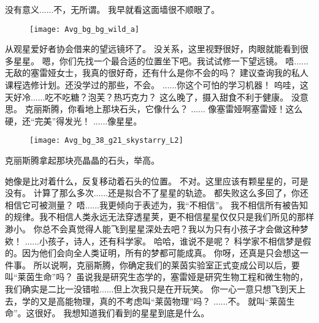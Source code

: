 \documentclass[openany]{book}
\begin{document}
\begin{dialogue}
     没有意义......不，无所谓。
     我早就看这面墙很不顺眼了。
    \begin{figure}[h]
        \centering
        \texttt{[image: Avg\_bg\_bg\_wild\_a]}
    \end{figure}
     从观星爱好者协会借来的望远镜坏了。
     没关系，这里视野很好，肉眼就能看到很多星星。
     嗯，你们先找一个最合适的位置坐下吧。我试试修一下望远镜。
     唔......无敌的塞雷娅女士，我真的很好奇，还有什么是你不会的吗？
     建议查询我的私人课程选修计划。还没学过的那些，不会。
     ......你这个可怕的学习机器！
     呜哇，这天好冷......吃不吃糖？泡芙？热巧克力？
     这么晚了，摄入甜食不利于健康。
     没意思。
     克丽斯腾，你看地上那块石头，它像什么？
     ......
     像塞雷娅啊塞雷娅！这么硬，还“完美”得发光！
     ......像星星。\par
    \begin{figure}[h]
        \centering
        \texttt{[image: Avg\_bg\_38\_g21\_skystarry\_L2]}
    \end{figure}
    克丽斯腾拿起那块亮晶晶的石头，举高。\par
    她像是比对着什么，反复移动着石头的位置。
     不对。这里应该有颗星星的，可是没有。
     计算了那么多次......还是拟合不了星星的轨迹。
     都失败这么多回了，你还相信它可被测量？
     唔......我更倾向于表述为，我“不相信”。
     我不相信所有被告知的规律。我不相信人类永远无法穿透星荚，更不相信星星仅仅只是我们所见的那样渺小。
     你总不会真觉得人能飞到星星深处去吧？我以为只有小孩子才会做这种梦欸！
     ......小孩子，诗人，还有科学家。
     哈哈，谁说不是呢？
     科学家不相信梦是假的。因为他们会向全人类证明，所有的梦都可能成真。
     你呀，还真是只会想这一件事。
     所以说啊，克丽斯腾，你确定我们的莱茵实验室正式变成公司以后，要叫“莱茵生命”吗？
     虽说我是研究生态学的，塞雷娅是研究生物工程和微生物的，我们确实是二比一没错啦......但上次我只是在开玩笑。
     你一心一意只想飞到天上去，学的又是高能物理，真的不考虑叫“莱茵物理”吗？
     ......不。
     就叫“莱茵生命”。这很好。
     我想知道我们看到的星星到底是什么。

\end{dialogue}
\end{document}
